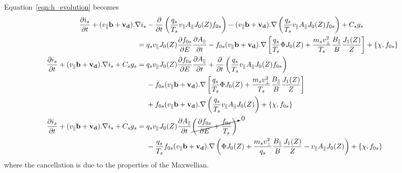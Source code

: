 \documentclass[10pt,a4paper]{article}
\newcommand{\dd}{\partial}
\begin{document}
Equation~\ref{eqn:h_evolution} becomes
\begin{align}
  \frac{\dd i_s}{\dd t} + (v_\parallel \mathbf{b} + \mathbf{v_d}).\nabla i_s
  & - \frac{\dd}{\dd t} \left( \frac{q_s}{T_s} v_\parallel A_\parallel J_0(Z)
    f_{0s} \right) - (v_\parallel \mathbf{b} + \mathbf{v_d}).\nabla \left(
    \frac{q_s}{T_s} v_\parallel A_\parallel J_0(Z) f_{0s} \right)
  + C_s g_s \nonumber \\
  = {}& q_s v_\parallel J_0(Z) \frac{\dd f_{0s}}{\dd E} \frac{\dd
    A_\parallel}{\dd t} 
  - f_{0s}(v_\parallel \mathbf{b} + \mathbf{v_d}).\nabla 
  \left[ \frac{q_s}{T_s} \Phi J_0(Z) +\frac{m_s v_\perp^2}{T_s}
    \frac{B_\parallel}{B} \frac{J_1(Z)}{Z} \right] + \left\{ \chi,
    f_{0s}\right\} \nonumber \\
  \frac{\dd i_s}{\dd t} + (v_\parallel \mathbf{b} + \mathbf{v_d}).\nabla i_s + C_s g_s 
  = {}& q_s v_\parallel J_0(Z) \frac{\dd f_{0s}}{\dd E} \frac{\dd
    A_\parallel}{\dd t} + \frac{\dd}{\dd t} \left( \frac{q_s}{T_s} v_\parallel
    A_\parallel J_0(Z) f_{0s} \right) \nonumber \\
  {}& - f_{0s}(v_\parallel \mathbf{b} + \mathbf{v_d}).\nabla 
  \left[ \frac{q_s}{T_s} \Phi J_0(Z) +\frac{m_s v_\perp^2}{T_s}
    \frac{B_\parallel}{B} \frac{J_1(Z)}{Z} \right] \nonumber \\
  {}& + f_{0s} (v_\parallel \mathbf{b} + \mathbf{v_d}).\nabla \left(
    \frac{q_s}{T_s} v_\parallel A_\parallel J_0(Z) \right)
  + \left\{ \chi, f_{0s}\right\} \nonumber \\
  \frac{\dd i_s}{\dd t} + (v_\parallel \mathbf{b} + \mathbf{v_d}).\nabla i_s + C_s g_s 
  = {}& q_s v_\parallel J_0(Z) \frac{\dd A_\parallel}{\dd t}
  \cancelto{0}{ \left( \frac{\dd f_{0s}}{\dd E} + \frac{f_{0s}}{T_s} \right) }
  \nonumber \\
  {}& - \frac{q_s}{T_s} f_{0s} (v_\parallel \mathbf{b} + \mathbf{v_d}).\nabla
  \left( \Phi J_0(Z) + \frac{m_s v_\perp^2}{q_s} \frac{B_\parallel}{B}
    \frac{J_1(Z)}{Z} - v_\parallel A_\parallel J_0(Z) \right) + \left\{ \chi, f_{0s}\right\}
\end{align}
where the cancellation is due to the properties of the Maxwellian.
\end{document}
